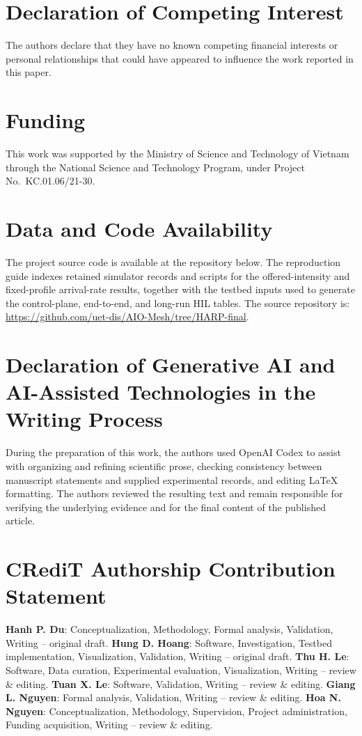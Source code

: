\documentclass[final,5p]{elsarticle}
\newcommand{\rev}[1]{\textcolor{revisiongreen}{#1}}
\let\newrev\rev
\begin{document}
\section*{Declaration of Competing Interest}
The authors declare that they have no known competing financial interests or personal relationships that could have appeared to influence the work reported in this paper.

\section*{Funding} 
\noindent This work was supported by the Ministry of Science and Technology of Vietnam through the National Science and Technology Program, under Project No.~KC.01.06/21-30.

\section*{Data and Code Availability}
\newrev{The project source code is available at the repository below. The reproduction guide indexes retained simulator records and scripts for the offered-intensity and fixed-profile arrival-rate results, together with the testbed inputs used to generate the control-plane, end-to-end, and long-run HIL tables. The source repository is:}
\url{https://github.com/uet-dis/AIO-Mesh/tree/HARP-final}.

\section*{Declaration of Generative AI and AI-Assisted Technologies in the Writing Process}
During the preparation of this work, the authors used OpenAI Codex to assist with organizing and refining scientific prose, checking consistency between manuscript statements and supplied experimental records, and editing LaTeX formatting. The authors reviewed the resulting text and remain responsible for verifying the underlying evidence and for the final content of the published article.

\section*{CRediT Authorship Contribution Statement}
\textbf{Hanh P. Du}: Conceptualization, Methodology, Formal analysis, Validation, Writing -- original draft.
\textbf{Hung D. Hoang}: Software, Investigation, Testbed implementation, Visualization, Validation, Writing -- original draft.
\textbf{Thu H. Le}: Software, Data curation, Experimental evaluation, Visualization, Writing -- review \& editing.
\textbf{Tuan X. Le}: Software, Validation, Writing -- review \& editing.
\textbf{Giang L. Nguyen}: Formal analysis, Validation, Writing -- review \& editing.
\textbf{Hoa N. Nguyen}: Conceptualization, Methodology, Supervision, Project administration, Funding acquisition, Writing -- review \& editing.



\end{document}
